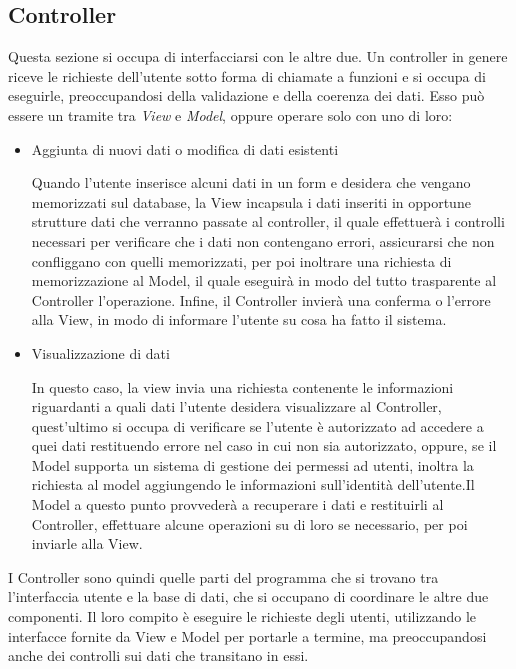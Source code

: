 \subsection{Controller}
Questa sezione si occupa di interfacciarsi con le altre due. Un controller in genere riceve le richieste dell'utente sotto forma di chiamate a funzioni e si occupa di eseguirle, preoccupandosi della validazione e della coerenza dei dati. Esso può essere un tramite tra \emph{View} e \emph{Model}, oppure operare solo con uno di loro:
\begin{itemize}
	\item Aggiunta di nuovi dati o modifica di dati esistenti
	
	Quando l'utente inserisce alcuni dati in un form e desidera che vengano memorizzati sul database, la View incapsula i dati inseriti in opportune strutture dati che verranno passate al controller, il quale effettuerà i controlli necessari per verificare che i dati non contengano errori, assicurarsi che non confliggano con quelli memorizzati, per poi inoltrare una richiesta di memorizzazione al Model, il quale eseguirà in modo del tutto trasparente al Controller l'operazione. Infine, il Controller invierà una conferma o l'errore alla View, in modo di informare l'utente su cosa ha fatto il sistema.
	\item Visualizzazione di dati
	
	In questo caso, la view invia una richiesta contenente le informazioni riguardanti a quali dati l'utente desidera visualizzare al Controller, quest'ultimo si occupa di verificare se l'utente è autorizzato ad accedere a quei dati restituendo errore nel caso in cui non sia autorizzato, oppure, se il Model supporta un sistema di gestione dei permessi ad utenti, inoltra la richiesta al model aggiungendo le informazioni sull'identità dell'utente.Il Model a questo punto provvederà a recuperare i dati e restituirli al Controller, effettuare alcune operazioni su di loro se necessario, per poi inviarle alla View.
\end{itemize}

I Controller sono quindi quelle parti del programma che si trovano tra l'interfaccia utente e la base di dati, che si occupano di coordinare le altre due componenti. Il loro compito è eseguire le richieste degli utenti, utilizzando le interfacce fornite da View e Model per portarle a termine, ma preoccupandosi anche dei controlli sui dati che transitano in essi.
